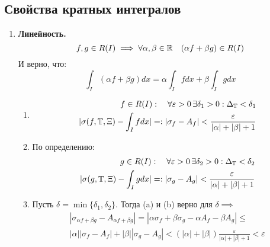 \documentclass[a4paper, 10pt]{article}
\begin{document}
\subsection{Свойства кратных интегралов}
\begin{enumerate}
    \item \textbf{Линейность.}
    \begin{equation*}
        f, g \in R(I) \implies \forall \alpha, \beta \in \operatorname{\mathbb{R}} \quad(\alpha f + \beta g)\in R(I)
    \end{equation*}
    И верно, что:
    \begin{equation*}
            \int_I(\alpha f + \beta g)dx = \alpha\int_I fdx + \beta\int_Igdx
    \end{equation*}
\proof 
\begin{enumerate}
    \item
\begin{equation*}
\begin{aligned}
    f\in R(I): \quad \forall \varepsilon > 0 \, \exists\delta_1>0: \Delta_{\operatorname{\mathbb{T}}} < \delta_1 \\
    |\sigma(f, \operatorname{\mathbb{T}}, \Xi)  - \int_Ifdx| =: |\sigma_f - A_f| < \frac{\varepsilon}{|\alpha|+|\beta|+1}
\end{aligned}
\end{equation*}
\item По определению:
\begin{equation*}
    \begin{aligned}
        g\in R(I): \quad \forall \varepsilon > 0 \, \exists\delta_2>0: \Delta_{\operatorname{\mathbb{T}}} < \delta_2 \\
|\sigma(g, \operatorname{\mathbb{T}}, \Xi)  - \int_Igdx| =: |\sigma_g - A_g| < \frac{\varepsilon}{|\alpha|+|\beta|+1}
    \end{aligned}
\end{equation*}
\item Пусть $\delta = \min\{\delta_1, \delta_2\}$. Тогда (a) и (b) верно для $\delta \implies$
\begin{equation*}
    \begin{aligned}
        |\sigma_{\alpha f+\beta g} - A_{\alpha f+ \beta g}| = |\alpha\sigma_f + \beta\sigma_g - \alpha A_f - \beta A_g| \le \\
        |\alpha||\sigma_f - A_f| + |\beta||\sigma_g-A_g| < (|\alpha| + |\beta|) \frac{\varepsilon}{|\alpha|+|\beta|+1} < \varepsilon
    \end{aligned}
\end{equation*}
\end{enumerate}
\QED


\end{enumerate}
\end{document}
